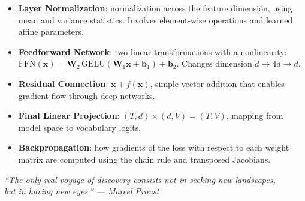 \documentclass[11pt, a4paper]{article}
\newcommand{\vx}{\bm{x}}
\newcommand{\mW}{\bm{W}}
\begin{document}
\begin{itemize}[nosep]
  \item \textbf{Layer Normalization}: normalization across the feature dimension,
        using mean and variance statistics. Involves element-wise operations and
        learned affine parameters.
  \item \textbf{Feedforward Network}: two linear transformations with a nonlinearity:
        $\text{FFN}(\vx) = \mW_2 \, \text{GELU}(\mW_1 \vx + \bm{b}_1) + \bm{b}_2$.
        Changes dimension $d \to 4d \to d$.
  \item \textbf{Residual Connection}: $\vx + f(\vx)$, simple vector addition
        that enables gradient flow through deep networks.
  \item \textbf{Final Linear Projection}: $(T, d) \times (d, V) = (T, V)$,
        mapping from model space to vocabulary logits.
  \item \textbf{Backpropagation}: how gradients of the loss with respect to
        each weight matrix are computed using the chain rule and transposed Jacobians.
\end{itemize}

\vfill
\begin{center}
\textit{``The only real voyage of discovery consists not in seeking new landscapes,\\
but in having new eyes.'' --- Marcel Proust}
\end{center}
\end{document}
